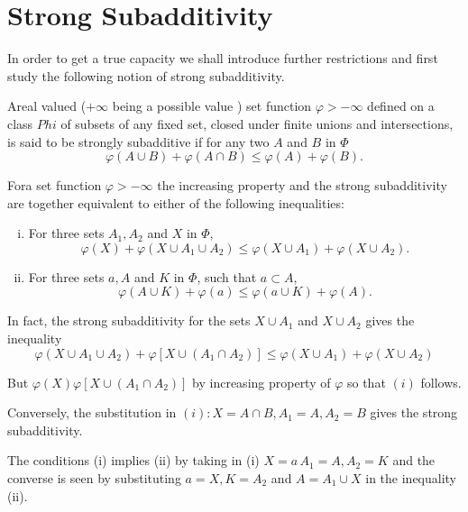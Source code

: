 \section{Strong Subadditivity}\label{p2:chap2:sec4} %

In order to get a true capacity we shall introduce further
restrictions and first study the following notion of strong
subadditivity. 

\begin{defn}\label{p2:chap2:sec4:def5}%
  Areal valued ($+ \infty$ being a possible value ) set function
  $\varphi > - \infty$ defined on a class $Phi$ of subsets of any
  fixed set, closed under finite unions and intersections, is said to
  be strongly subadditive if for any two $A$ and $B$ in $\Phi$ 
  $$
  \varphi(A \cup B)+ \varphi(A \cap B) \leq \varphi(A) + \varphi(B).
  $$
\end{defn}

\begin{prop}\label{p2:chap2:sec4:prop4}%
  For\pageoriginale a set function $\varphi > -\infty$ the increasing property and
  the strong subadditivity are together equivalent to either of the
  following inequalities: 
  \begin{enumerate}[(i)]
  \item For three sets $A_1,A_2$ and $X$ in $\Phi$,
    $$
    \varphi(X) + \varphi(X \cup A_1 \cup A_2) \leq \varphi(X \cup A_1)
    + \varphi(X \cup A_2). 
    $$
  \item For three sets $a,A$ and $K$ in $\Phi$, such that $a \subset A$,
    $$
    \varphi(A\cup K) + \varphi(a) \leq \varphi(a \cup K) + \varphi(A).
    $$
  \end{enumerate}
\end{prop}

In fact, the strong subadditivity for the sets $X \cup A_1$ and  $X
\cup A_2$ gives the inequality  
$$
\varphi( X \cup A_1 \cup A_2) + \varphi[X \cup (A_1 \cap A_2)] \leq
\varphi( X \cup A_1)+\varphi( X \cup A_2) 
$$

But $\varphi (X)  \varphi[X \cup (A_1 \cap A_2)]$ by increasing
property of $\varphi$ so that $(i)$ follows. 

Conversely, the substitution in $(i) :X = A \cap B, A_1 =A, A_2= B$
gives the strong subadditivity. 

The conditions (i) implies (ii) by taking in (i) $X =a \,A_1 =A, A_2
=K$ and the converse is seen by substituting $a=X, K =A_2$ and $A = A_1
\cup X$ in the inequality (ii). 

